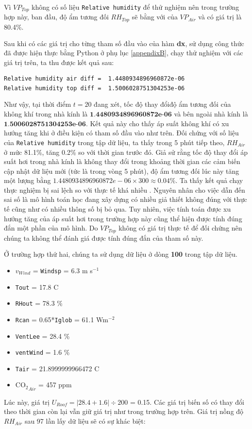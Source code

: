 \documentclass[a4paper]{article}
\begin{document}
Vì $VP_{Top}$ không có số liệu \texttt{Relative humidity} để thử nghiệm nên trong trường hợp này, ban đầu, độ ẩm tương đối $RH_{Top}$ sẽ bằng với của $VP_{Air}$ và có giá trị là 80.4\%. 

Sau khi có các giá trị cho từng tham số đầu vào của hàm \textbf{dx}, sử dụng công thức đã được hiện thực bằng Python ở phụ lục \ref{appendixB}, chạy thử nghiệm với các giá trị trên, ta thu được kết quả sau:

\begin{verbatim}
Relative humidity air diff =  1.4480934896960872e-06
Relative humidity top diff =  1.5006028751304253e-06
\end{verbatim}

Như vậy, tại thời điểm $t = 20$ đang xét, tốc độ thay đổiđộ ẩm tương đối của không  khí trong nhà kính là $\textbf{1.4480934896960872e-06}$ và bên ngoài nhà kính là $\textbf{1.5006028751304253e-06}$. Kết quả này cho thấy áp suất không khí có xu hướng tăng khi ở điều kiện có tham số đầu vào như trên. Đối chứng với số liệu của \texttt{Relative humidity} trong tập dữ liệu, ta thấy trong 5 phút tiếp theo,  $RH_{Air}$ ở mức 81.1\%, tăng 0.2\% so với thời gian trước đó. Giả sử rằng tốc độ thay đổi áp suất hơi trong nhà kính là không thay đổi trong khoảng thời gian các cảm biến cập nhật dữ liệu mới (tức là trong vòng 5 phút), độ ẩm tương đối lúc này tăng một lượng bằng   $ 1.4480934896960872e-06 \times 300 \approx 0.04\%$. Ta thấy kết quả chạy thực nghiệm bị sai lệch so với thực tế khá nhiều . Nguyên nhân cho việc dẫn đến sai số là mô hình toán học đang xây dựng có nhiều giả thiết không đúng với thực tế cũng như có nhiều thông số bị bỏ qua. Tuy nhiên, việc tính toán được xu hướng tăng của áp suất hơi trong trường hợp này cũng thể hiện được tính đúng đắn một phần của mô hình. Do  $VP_{Top}$ không có giá trị thực tế để đối chứng nên chúng ta không thể đánh giá được tính đúng đắn của tham số này.\par

Ở trường hợp thứ hai, chúng ta sử dụng dữ liệu ở dòng \textbf{100} trong tập dữ liệu.
\begin{itemize}
    \item $v_{Wind}$ = \texttt{Windsp} = 6.3 m s$^{-1}$ 
    \item \texttt{Tout} = 17.8 \degree C
    \item \texttt{RHout} = 78.3 \%
    \item \texttt{Rcan} = 0.65*\texttt{Iglob} = 61.1 Wm$^{-2}$    
    \item \texttt{VentLee} = 28.4 \%
    \item \texttt{ventWind} = 1.6 \%
    \item \texttt{Tair} = 21.8999999966472 \degree C
    \item $\mathrm{CO_{2}}_{Air}$ = 457 ppm
\end{itemize}
Lúc này, giá trị $U_{Roof} = \left | 28.4 + 1.6 \right | \div 200$ = 0.15. Các giá trị biến số có thay đổi theo thời gian còn lại vẫn giữ giá trị như trong trường hợp trên. Giá trị nồng độ $RH_{Air}$ sau 97 lần lấy dữ liệu sẽ có sự khác biệt:
\end{document}
